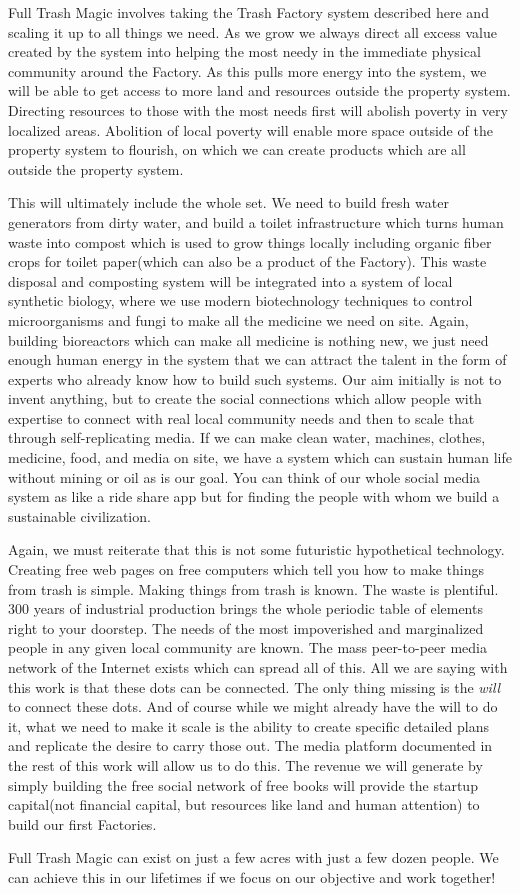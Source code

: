 Full Trash Magic involves taking the Trash Factory system described here
and scaling it up to all things we need. As we grow we always direct all
excess value created by the system into helping the most needy in the
immediate physical community around the Factory. As this pulls more
energy into the system, we will be able to get access to more land and
resources outside the property system. Directing resources to those with
the most needs first will abolish poverty in very localized areas.
Abolition of local poverty will enable more space outside of the
property system to flourish, on which we can create products which are
all outside the property system.

This will ultimately include the whole set. We need to build fresh water
generators from dirty water, and build a toilet infrastructure which
turns human waste into compost which is used to grow things locally
including organic fiber crops for toilet paper(which can also be a
product of the Factory). This waste disposal and composting system will
be integrated into a system of local synthetic biology, where we use
modern biotechnology techniques to control microorganisms and fungi to
make all the medicine we need on site. Again, building bioreactors which
can make all medicine is nothing new, we just need enough human energy
in the system that we can attract the talent in the form of experts who
already know how to build such systems. Our aim initially is not to
invent anything, but to create the social connections which allow people
with expertise to connect with real local community needs and then to
scale that through self-replicating media. If we can make clean water,
machines, clothes, medicine, food, and media on site, we have a system
which can sustain human life without mining or oil as is our goal. You
can think of our whole social media system as like a ride share app but
for finding the people with whom we build a sustainable civilization.

Again, we must reiterate that this is not some futuristic hypothetical
technology. Creating free web pages on free computers which tell you how
to make things from trash is simple. Making things from trash is known.
The waste is plentiful. 300 years of industrial production brings the
whole periodic table of elements right to your doorstep. The needs of
the most impoverished and marginalized people in any given local
community are known. The mass peer-to-peer media network of the Internet
exists which can spread all of this. All we are saying with this work is
that these dots can be connected. The only thing missing is the
\emph{will} to connect these dots. And of course while we might already
have the will to do it, what we need to make it scale is the ability to
create specific detailed plans and replicate the desire to carry those
out. The media platform documented in the rest of this work will allow
us to do this. The revenue we will generate by simply building the free
social network of free books will provide the startup capital(not
financial capital, but resources like land and human attention) to build
our first Factories.

Full Trash Magic can exist on just a few acres with just a few dozen
people. We can achieve this in our lifetimes if we focus on our
objective and work together!
